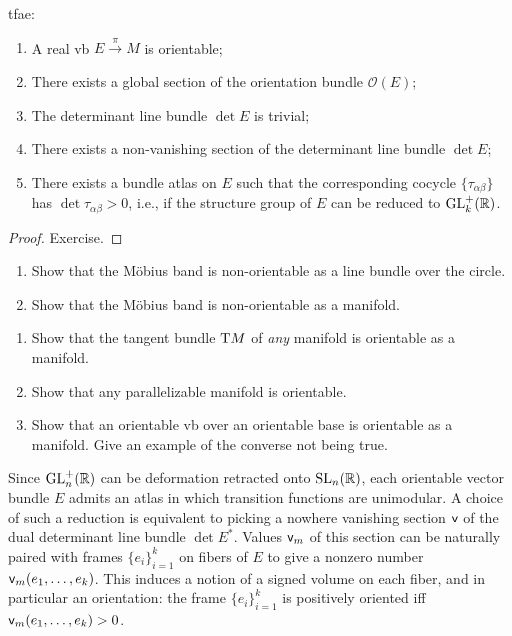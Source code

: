 \begin{prop}\label{prop orientation}
    \gls{tfae}:
    \begin{enumerate}
        \item A real \gls{vb} $E\overset\pi\to M$ is orientable;
        \item There exists a global section of the orientation bundle $\mathcal{O}(E)$;
        \item The determinant line bundle $\det E$ is trivial;
        \item There exists a non-vanishing section of the determinant line bundle $\det E$;
        \item There exists a bundle atlas on $E$ such that the corresponding cocycle $\{\tau_{\alpha\beta}\}$ has $\det\tau_{\alpha\beta}>0$, i.e., if the structure group of $E$ can be reduced to $\operatorname{GL}^+_k(\mathbb{R} )$.
    \end{enumerate}
\end{prop}
\begin{proof}
    Exercise.
\end{proof}

\begin{xca}
\begin{enumerate}
    \item Show that the M\"obius band is non-orientable as a line bundle over the circle.
    \item Show that the M\"obius band is non-orientable as a manifold.
\end{enumerate}
\end{xca}

\begin{xca}
\begin{enumerate}
    \item Show that the tangent bundle $\mathrm{T} M$ of \emph{any} manifold is orientable as a manifold.
    \item Show that any parallelizable manifold is orientable.
    \item Show that an orientable \gls{vb} over an orientable base is orientable as a manifold. Give an example of the converse not being true.
\end{enumerate}
\end{xca}

Since $\operatorname{GL}^+_n(\mathbb{R})$ can be deformation retracted onto $\operatorname{SL}_n(\mathbb{R})$, each orientable vector bundle $E$ admits an atlas in which transition functions are unimodular. A choice of such a reduction is equivalent to picking a nowhere vanishing section $\mathsf{v}$ of the dual determinant line bundle $\det E^\ast$. Values $\mathsf{v}_m$ of this section can be naturally paired with frames $\{e_i\}_{i=1}^k$ on fibers of $E$ to give a nonzero number $\mathsf{v}_m(e_1,\ldots,e_k)$. This induces a notion of a signed volume on each fiber, and in particular an orientation: the frame $\{e_i\}_{i=1}^k$ is positively oriented iff $\mathsf{v}_m(e_1,\ldots,e_k)>0$.

